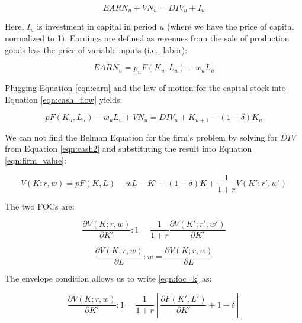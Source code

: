\documentclass[letterpaper,12pt]{article}
\theoremstyle{definition}
\begin{document}
\begin{spacing}{1.5}
      \begin{equation}
      \label{eqn:cash_flow}
      EARN_{u}+VN_{u} = DIV_{u} + I_{u}
      \end{equation}

      \noindent\noindent Here, $I_{u}$ is investment in capital in period $u$ (where we have the price of capital normalized to 1).  Earnings are defined as revenues from the sale of production goods less the price of variable inputs (i.e., labor):

      \begin{equation}
      \label{eqn:earn}
      EARN_{u}= p_{u}F(K_{u},L_{u}) - w_{u}L_{u}
      \end{equation}

      \noindent\noindent Plugging Equation \ref{eqn:earn} and the law of motion for the capital stock into Equation \ref{eqn:cash_flow} yields:

      \begin{equation}
      \label{eqn:cash}
      pF(K_{u},L_{u}) - w_{u}L_{u} + VN_{u} = DIV_{u} + K_{u+1} - (1-\delta)K_{u}
      \end{equation}

      \noindent\noindent We can not find the Belman Equation for the firm's problem by solving for $DIV$ from Equation \ref{eqn:cash2} and substituting the result into Equation \ref{eqn:firm_value}:

      \begin{equation}
      \label{eqn:cash2}
      V(K; r, w) = pF(K,L) - wL  - K' + (1-\delta)K + \frac{1}{1+r}V(K';r',w')
      \end{equation}

      The two FOCs are:

      \begin{equation}
      \label{eqn:foc_k}
      \frac{\partial V(K; r, w)}{\partial K'} : 1= \frac{1}{1+r}\frac{\partial V(K';r',w')}{\partial K'}
      \end{equation}

      \begin{equation}
      \label{eqn:foc_l}
      \frac{\partial V(K; r, w)}{\partial L} : w= \frac{\partial V(K;r,w)}{\partial L}
      \end{equation}

      \noindent\noindent The envelope condition allows us to write \ref{eqn:foc_k} as:

      \begin{equation}
      \label{eqn:foc_k2}
      \frac{\partial V(K; r, w)}{\partial K'} : 1= \frac{1}{1+r}\left[ \frac{\partial F(K',L')}{\partial K'} + 1 -\delta \right]
      \end{equation}


\end{spacing}
\end{document}

